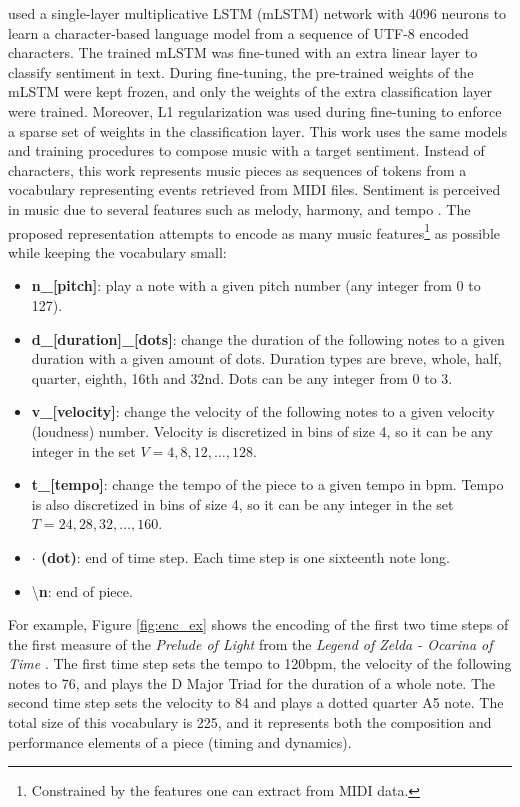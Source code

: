 \citet{radford_2017} used a single-layer multiplicative LSTM (mLSTM) network \cite{krause2017} with 4096 neurons to learn a character-based language model from a sequence of UTF-8 encoded characters. The trained mLSTM was fine-tuned with an extra linear layer to classify sentiment in text. During fine-tuning, the pre-trained weights of the mLSTM were kept frozen, and only the weights of the extra classification layer were trained. Moreover, L1 regularization was used during fine-tuning to enforce a sparse set of weights in the classification layer. This work uses the same models and training procedures to compose music with a target sentiment. Instead of characters, this work represents music pieces as sequences of tokens from a vocabulary representing events retrieved from MIDI files. Sentiment is perceived in music due to several features such as melody, harmony, and tempo \cite{kim2010music}. The proposed representation attempts to encode as many music features\footnote{Constrained by the features one can extract from MIDI data.} as possible while keeping the vocabulary small:

\begin{itemize}
    \item \textbf{n\_[pitch]}: play a note with a given pitch number (any integer from 0 to 127).
    \item \textbf{d\_[duration]\_[dots]}: change the duration of the following notes to a given
    duration with a given amount of dots. Duration types are breve, whole, half, quarter,
    eighth, 16th and 32nd. Dots can be any integer from 0 to 3.
    \item \textbf{v\_[velocity]}: change the velocity of the following  notes to a given velocity (loudness) number. Velocity is discretized in
    bins of size 4, so it can be any integer in the set $V = {4, 8, 12, \dots, 128}$.
    \item \textbf{t\_[tempo]}: change the tempo of the piece to a given tempo in bpm. Tempo is also discretized in bins of size 4, so it can be any integer in the set $T = {24, 28, 32, \dots, 160}$.
    \item \textbf{$\cdot$ (dot)}: end of time step. Each time step is one sixteenth note long.
    \item \textbackslash \textbf{n}: end of piece.
\end{itemize}

For example, Figure \ref{fig:enc_ex} shows the encoding of the first two time steps of the first measure of the \textit{Prelude of Light} from the \textit{Legend of Zelda - Ocarina of Time} . The first time step sets the tempo to 120bpm, the velocity of the following notes to 76, and plays the D Major Triad for the duration of a whole note. The second time step sets the velocity to 84 and plays a dotted quarter A5 note. The total size of this vocabulary is 225, and it represents both the composition and performance elements of a piece (timing and dynamics).

